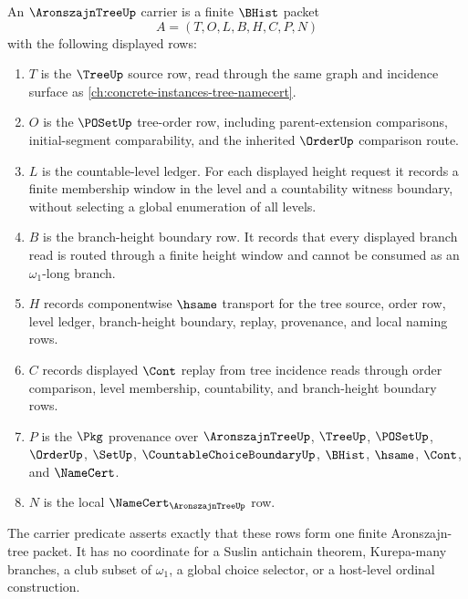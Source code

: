 \begin{definition}\label{def:aronszajn-tree-carrier}
An $\AronszajnTreeUp$ carrier is a finite $\BHist$ packet
$$
A=(T,O,L,B,H,C,P,N)
$$
with the following displayed rows:
\begin{enumerate}
\item $T$ is the $\TreeUp$ source row, read through the same graph and incidence surface as \autoref{ch:concrete-instances-tree-namecert}.
\item $O$ is the $\POSetUp$ tree-order row, including parent-extension comparisons, initial-segment comparability, and the inherited $\OrderUp$ comparison route.
\item $L$ is the countable-level ledger. For each displayed height request it records a finite membership window in the level and a countability witness boundary, without selecting a global enumeration of all levels.
\item $B$ is the branch-height boundary row. It records that every displayed branch read is routed through a finite height window and cannot be consumed as an $\omega_1$-long branch.
\item $H$ records componentwise $\hsame$ transport for the tree source, order row, level ledger, branch-height boundary, replay, provenance, and local naming rows.
\item $C$ records displayed $\Cont$ replay from tree incidence reads through order comparison, level membership, countability, and branch-height boundary rows.
\item $P$ is the $\Pkg$ provenance over $\AronszajnTreeUp$, $\TreeUp$, $\POSetUp$, $\OrderUp$, $\SetUp$, $\CountableChoiceBoundaryUp$, $\BHist$, $\hsame$, $\Cont$, and $\NameCert$.
\item $N$ is the local $\NameCert_{\AronszajnTreeUp}$ row.
\end{enumerate}
The carrier predicate asserts exactly that these rows form one finite Aronszajn-tree packet. It has no coordinate for a Suslin antichain theorem, Kurepa-many branches, a club subset of $\omega_1$, a global choice selector, or a host-level ordinal construction.
\end{definition}

